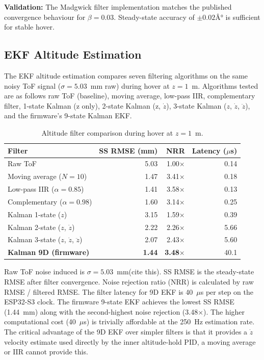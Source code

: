 \textbf{Validation:} The Madgwick filter implementation matches the
published convergence behaviour for $\beta = 0.03$. Steady-state accuracy of $\pm 0.02Â°$ is sufficient for stable hover.

\subsection{EKF Altitude Estimation}
\label{sec:ch3_a3}

The EKF altitude estimation compares seven filtering algorithms on the same noisy ToF signal ($\sigma = 5.03$~mm raw) during hover at $z = 1$~m. 
Algorithms tested are as follows raw ToF (baseline), moving average, low-pass IIR, complementary filter, 1-state Kalman (z only), 2-state Kalman (z, $\dot{z}$), 3-state Kalman ($z$, $\dot{z}$, $\ddot{z}$), and the firmware's 9-state Kalman EKF.

\begin{table}[ht]
  \caption{Altitude filter comparison during hover at $z = 1$~m. }
  \label{tab:ch3_a3}
  \centering
  \small
  \begin{tabular}{lrrr}
    \toprule
    Filter & SS RMSE (mm) & NRR & Latency ($\mu$s) \\
    \midrule
    Raw ToF                             & 5.03 & 1.00$\times$  & 0.14 \\
    Moving average ($N=10$)             & 1.47 & 3.41$\times$  & 0.18 \\
    Low-pass IIR ($\alpha=0.85$)        & 1.41 & 3.58$\times$  & 0.13 \\
    Complementary ($\alpha=0.98$)       & 1.60 & 3.14$\times$  & 0.25 \\
    Kalman 1-state ($z$)                & 3.15 & 1.59$\times$  & 0.39 \\
    Kalman 2-state ($z$, $\dot{z}$)     & 2.22 & 2.26$\times$  & 5.66 \\
    Kalman 3-state ($z$, $\dot{z}$, $\ddot{z}$) & 2.07 & 2.43$\times$ & 5.60 \\
    \textbf{Kalman 9D (firmware)}       & \textbf{1.44} & \textbf{3.48$\times$} & 40.1 \\
    \bottomrule
  \end{tabular}
\end{table}

Raw ToF noise induced is  $\sigma = 5.03$~mm(cite this). SS RMSE  is the steady-state RMSE after filter convergence. Noise rejection ratio (NRR) is calculated by raw RMSE / filtered RMSE. 
The filter latency for 9D EKF is 40~$\mu$s per step on the ESP32-S3 clock.
The firmware 9-state EKF achieves the lowest SS RMSE (1.44~mm) along with the second-highest noise rejection (3.48$\times$). 
The higher computational cost (40~$\mu$s) is trivially affordable at the 250~Hz estimation rate. 
The critical advantage of the 9D EKF over simpler filters is that it provides a $\dot{z}$ velocity estimate used directly by the inner altitude-hold PID, a moving average or IIR cannot provide this.

